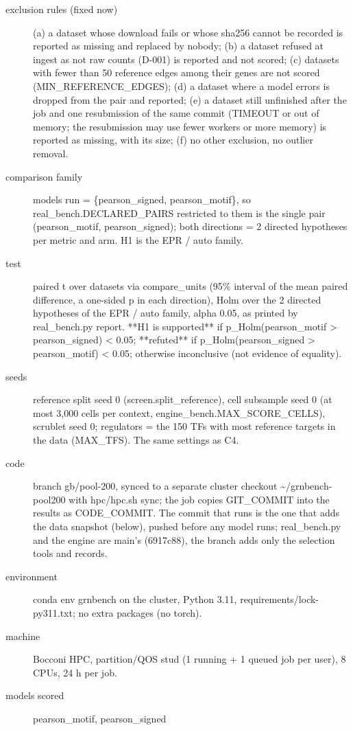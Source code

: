 \documentclass{article}
\begin{document}
\begin{description}
\item[exclusion rules (fixed now)] (a) a dataset whose download fails or whose sha256 cannot be recorded is reported as missing and replaced by nobody; (b) a dataset refused at ingest as not raw counts (D-001) is reported and not scored; (c) datasets with fewer than 50 reference edges among their genes are not scored (MIN\_REFERENCE\_EDGES); (d) a dataset where a model errors is dropped from the pair and reported; (e) a dataset still unfinished after the job and one resubmission of the same commit (TIMEOUT or out of memory; the resubmission may use fewer workers or more memory) is reported as missing, with its size; (f) no other exclusion, no outlier removal.
\item[comparison family] models run = \{pearson\_signed, pearson\_motif\}, so real\_bench.DECLARED\_PAIRS restricted to them is the single pair (pearson\_motif, pearson\_signed); both directions = 2 directed hypotheses per metric and arm. H1 is the EPR / auto family.
\item[test] paired t over datasets via compare\_units (95\% interval of the mean paired difference, a one-sided p in each direction), Holm over the 2 directed hypotheses of the EPR / auto family, alpha 0.05, as printed by real\_bench.py report. **H1 is supported** if p\_Holm(pearson\_motif > pearson\_signed) < 0.05; **refuted** if p\_Holm(pearson\_signed > pearson\_motif) < 0.05; otherwise inconclusive (not evidence of equality).
\item[seeds] reference split seed 0 (screen.split\_reference), cell subsample seed 0 (at most 3,000 cells per context, engine\_bench.MAX\_SCORE\_CELLS), scrublet seed 0; regulators = the 150 TFs with most reference targets in the data (MAX\_TFS). The same settings as C4.
\item[code] branch gb/pool-200, synced to a separate cluster checkout \textasciitilde{}/grnbench-pool200 with hpc/hpc.sh sync; the job copies GIT\_COMMIT into the results as CODE\_COMMIT. The commit that runs is the one that adds the data snapshot (below), pushed before any model runs; real\_bench.py and the engine are main's (6917c88), the branch adds only the selection tools and records.
\item[environment] conda env grnbench on the cluster, Python 3.11, requirements/lock-py311.txt; no extra packages (no torch).
\item[machine] Bocconi HPC, partition/QOS stud (1 running + 1 queued job per user), 8 CPUs, 24 h per job.
\item[models scored] pearson\_motif, pearson\_signed
\end{description}
\end{document}
